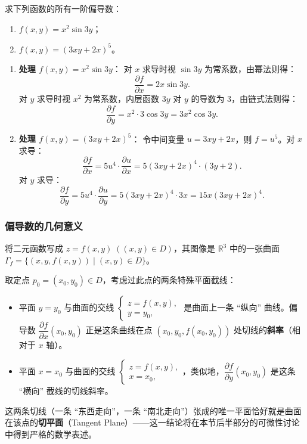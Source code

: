 \documentclass[lang=cn,11pt]{elegantbook}
\begin{document}
\begin{exercise}[复合函数的偏导数] \label{ex:pd-composite}
求下列函数的所有一阶偏导数：
\begin{enumerate}
  \item[(1)] $f(x,y)=x^2\sin 3y$；
  \item[(2)] $f(x,y)=(3xy+2x)^5$。
\end{enumerate}
\end{exercise}

\begin{solution}
\begin{enumerate}
  \item[(1)] \textbf{处理 $f(x,y)=x^2\sin 3y$}：
  对 $x$ 求导时视 $\sin 3y$ 为常系数，由幂法则得：
  \[
  \frac{\partial f}{\partial x}=2x\sin 3y.
  \]
  对 $y$ 求导时视 $x^2$ 为常系数，内层函数 $3y$ 对 $y$ 的导数为 $3$，由链式法则得：
  \[
  \frac{\partial f}{\partial y}=x^2\cdot 3\cos 3y=3x^2\cos 3y.
  \]
  
  \item[(2)] \textbf{处理 $f(x,y)=(3xy+2x)^5$}：
  令中间变量 $u=3xy+2x$，则 $f=u^5$。对 $x$ 求导：
  \[
  \frac{\partial f}{\partial x}=5u^4\cdot\frac{\partial u}{\partial x} =5(3xy+2x)^4\cdot(3y+2).
  \]
  对 $y$ 求导：
  \[
  \frac{\partial f}{\partial y}=5u^4\cdot\frac{\partial u}{\partial y} =5(3xy+2x)^4\cdot 3x=15x(3xy+2x)^4.
  \]
\end{enumerate}
\end{solution}

\subsubsection*{偏导数的几何意义}

\begin{remark}[偏导数的几何意义] \label{remark:pd-geometry}
将二元函数写成 $z=f(x,y)\;((x,y)\in D)$，其图像是 $\mathbb R^3$ 中的一张曲面 $\Gamma_f=\{(x,y,f(x,y))\mid(x,y)\in D\}$。

取定点 $p_0=(x_0,y_0)\in D$，考虑过此点的两条特殊平面截线：
\begin{itemize}
  \item 平面 $y=y_0$ 与曲面的交线 $\begin{cases}z=f(x,y),\\y=y_0,\end{cases}$ 是曲面上一条 ``纵向'' 曲线。偏导数 $\dfrac{\partial f}{\partial x}(x_0,y_0)$ 正是这条曲线在点 $(x_0,y_0,f(x_0,y_0))$ 处切线的\textbf{斜率}（相对于 $x$ 轴）。
  \item 平面 $x=x_0$ 与曲面的交线 $\begin{cases}z=f(x,y),\\x=x_0,\end{cases}$，类似地，$\dfrac{\partial f}{\partial y}(x_0,y_0)$ 是这条 ``横向'' 截线的切线斜率。
\end{itemize}

这两条切线（一条 ``东西走向''，一条 ``南北走向''）张成的唯一平面恰好就是曲面在该点的\textbf{切平面}（Tangent Plane）——这一结论将在本节后半部分的可微性讨论中得到严格的数学表述。
\end{remark}
\end{document}

